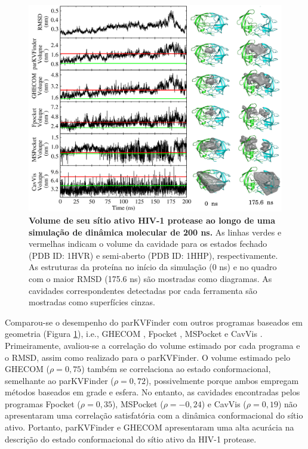 \documentclass[Portugues]{phdquali}
\def\ie{i.e.\onedot}
\begin{document}
\begin{figure}[ht]
  \centerline{\includegraphics[scale=0.15]{images/hiv1-protease-md-analysis.png}}
  \caption[Volume de seu sítio ativo HIV-1 protease ao longo de uma simulação de dinâmica molecular de 200 ns]{\textbf{Volume de seu sítio ativo HIV-1 protease ao longo de uma simulação de dinâmica molecular de 200 ns.} As linhas verdes e vermelhas indicam o volume da cavidade para os estados fechado (PDB ID: 1HVR) e semi-aberto (PDB ID: 1HHP), respectivamente. As estruturas da proteína no início da simulação (0 ns) e no quadro com o maior RMSD (175.6 ns) são mostradas como diagramas. As cavidades correspondentes detectadas por cada ferramenta são mostradas como superfícies cinzas.}
  \label{fig:hiv1-protease-dm-analysis}
\end{figure}

Comparou-se o desempenho do parKVFinder \cite{guerra2020} com outros programas baseados em geometria (Figura \ref{fig:hiv1-protease-dm-analysis}), \ie, GHECOM \cite{ghecom}, Fpocket \cite{fpocket}, MSPocket \cite{mspocket} e CavVis \cite{cavvis}. Primeiramente, avaliou-se a correlação do volume estimado por cada programa e o RMSD, assim como realizado para o parKVFinder. O volume estimado pelo GHECOM ($\rho = 0,75$) também se correlaciona ao estado conformacional, semelhante ao parKVFinder ($\rho = 0,72$), possivelmente porque ambos empregam métodos baseados em grade e esfera. No entanto, as cavidades encontradas pelos programas Fpocket ($\rho = 0,35$), MSPocket ($\rho = -0,24$) e CavVis ($\rho = 0,19$) não apresentaram uma correlação satisfatória com a dinâmica conformacional do sítio ativo. Portanto, parKVFinder e GHECOM apresentaram uma alta acurácia na descrição do estado conformacional do sítio ativo da HIV-1 protease. 
\end{document}
